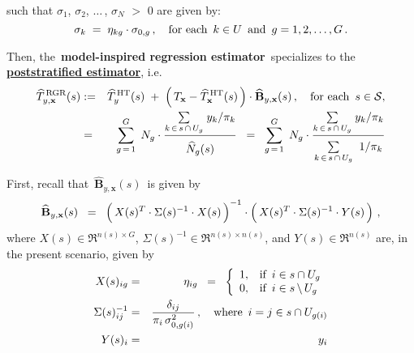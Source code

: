 \begin{proposition}
\begin{enumerate}
	such that
	$\sigma_{1}$, $\sigma_{2}$, $\ldots$\,, $\sigma_{N}$ $>$ $0$ are given by:
	\begin{equation*}
	\sigma_{k} \; = \; \eta_{kg}\cdot\sigma_{0,g}\,,
	\quad\textnormal{for each \,$k \in U$\, and \,$g = 1,2,\ldots,G$}\,.
	\end{equation*}
\end{enumerate}
\renewcommand{\theenumi}{\roman{enumi}}
\renewcommand{\labelenumi}{\textnormal{(\theenumi)}$\;\;$}
Then, the \,\textbf{model-inspired regression estimator}\,
specializes to the \,\underline{\textbf{poststratified estimator}}, i.e.
\begin{eqnarray*}
\widehat{T}^{\,\textnormal{RGR}}_{y,\mathbf{x}}(s)
& := &
	\widehat{T}^{\,\textnormal{HT}}_{y}(s)
	\; + \;
	\left(\,T_{\mathbf{x}} - \widehat{T}^{\,\textnormal{HT}}_{\mathbf{x}}(s) \,\right)
	\cdot
	\widehat{\mathbf{B}}_{y,\mathbf{x}}(s)\,,
	\quad\textnormal{for each \,$s \in \mathcal{S}$},
\\
& = &
	\overset{G}{\underset{g\,=\,1}{\sum}}\;\, N_{g}
	\cdot
	\dfrac{
		\underset{k\,\in\,s\,\cap\,U_{g}}{\sum}\;y_{k}/\pi_{k}
		}{
		\overset{{\color{white}.}}{\widehat{N}_{g}(s)}
		}
\;\; = \;\;
	\overset{G}{\underset{g\,=\,1}{\sum}}\;\, N_{g}
	\cdot
	\dfrac{
		\underset{k\,\in\,s\,\cap\,U_{g}}{\sum}\;y_{k}/\pi_{k}
		}{
		\underset{k\,\in\,s\,\cap\,U_{g}}{\overset{{\color{white}.}}{\sum}}\;\;1/\pi_{k}
		}
\end{eqnarray*}
\end{proposition}
\proof
First, recall that \,$\widehat{\mathbf{B}}_{y,\mathbf{x}}(s)$\, is given by
\begin{equation*}
\widehat{\mathbf{B}}_{y,\mathbf{x}}(s)
\;\; = \;\;
	\left(\,X(s)^{T} \overset{{\color{white}!}}{\cdot} \Sigma(s)^{-1} \cdot X(s)\,\right)^{-1}
	\cdot
	\left(\,X(s)^{T} \overset{{\color{white}!}}{\cdot} \Sigma(s)^{-1} \cdot Y(s) \,\right)\,,
\end{equation*}
where $X(s) \in \Re^{n(s) \times G}$, $\Sigma(s)^{-1} \in \Re^{n(s) \times n(s)}$, and $Y(s) \in \Re^{n(s)}$
are, in the present scenario, given by
\begin{eqnarray*}
X(s)_{ig}
& = &
	\eta_{ig}
\;\; = \;\;
	\left\{\begin{array}{cl}
		1, &  \textnormal{if \,$i \in s \cap U_{g}$}
		\\
		0, & \textnormal{if \,$i \in s\,\backslash\,U_{g}$}
	\end{array}\right.
\\
\Sigma(s)^{-1}_{ij}
& = &
	\dfrac{\delta_{ij}}{\pi_{i}\,\sigma^{2}_{0,g(i)}}\,,
	\quad
	\textnormal{where \,$i = j \in s \cap U_{g(i)}$}
\\
Y(s)_{i}
& = &
	y_{i}
\end{eqnarray*}
